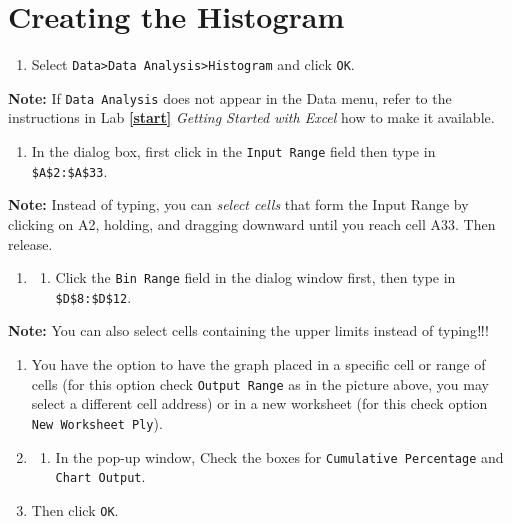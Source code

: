 \documentclass[
]{book}
\providecommand{\tightlist}{%
  \setlength{\itemsep}{0pt}\setlength{\parskip}{0pt}}
\begin{document}
\hypertarget{creating-the-histogram}{%
\section{Creating the Histogram}\label{creating-the-histogram}}

\begin{enumerate}
\def\labelenumi{\arabic{enumi}.}
\tightlist
\item
  Select \texttt{Data\textgreater{}Data\ Analysis\textgreater{}Histogram} and click \texttt{OK}.
\end{enumerate}

\textbf{Note:} If \texttt{Data\ Analysis} does not appear in the Data menu, refer to the instructions in Lab \textbf{\ref{start}} \emph{Getting Started with Excel} how to make it available.

\begin{enumerate}
\def\labelenumi{\arabic{enumi}.}
\setcounter{enumi}{1}
\tightlist
\item
  In the dialog box, first click in the \texttt{Input\ Range} field then type in \texttt{\$A\$2:\$A\$33}.
\end{enumerate}

\textbf{Note:} Instead of typing, you can \emph{select cells} that form the Input Range by clicking on A2, holding, and dragging downward until you reach cell A33. Then release.

\begin{enumerate}
\def\labelenumi{\arabic{enumi}.}
\setcounter{enumi}{2}
\item
  \begin{enumerate}
  \def\labelenumii{\arabic{enumii})}
  \setcounter{enumii}{2}
  \tightlist
  \item
    Click the \texttt{Bin\ Range} field in the dialog window first, then type in \texttt{\$D\$8:\$D\$12}.
  \end{enumerate}
\end{enumerate}

\textbf{Note:} You can also select cells containing the upper limits instead of typing‼!

\begin{enumerate}
\def\labelenumi{\arabic{enumi}.}
\setcounter{enumi}{3}
\item
  You have the option to have the graph placed in a specific cell or range of cells (for this option check \texttt{Output\ Range} as in the picture above, you may select a different cell address) or in a new worksheet (for this check option \texttt{New\ Worksheet\ Ply}).
\item
  \begin{enumerate}
  \def\labelenumii{\arabic{enumii})}
  \setcounter{enumii}{4}
  \tightlist
  \item
    In the pop-up window, Check the boxes for \texttt{Cumulative\ Percentage} and \texttt{Chart\ Output}.
  \end{enumerate}
\item
  Then click \texttt{OK}.
\end{enumerate}
\end{document}
